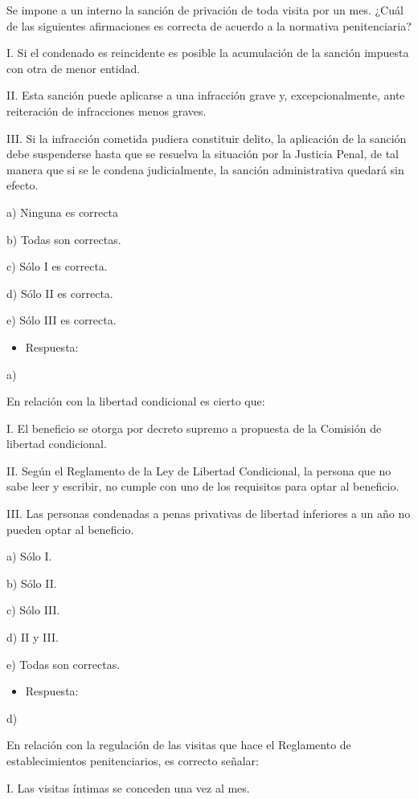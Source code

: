 \documentclass[letterpaper, 11pt]{article}
\begin{document}
Se impone a un interno la sanción de privación de toda visita por un mes. ¿Cuál de
las siguientes afirmaciones es correcta de acuerdo a la normativa penitenciaria?

I. Si el condenado es reincidente es posible la acumulación de la sanción impuesta
con otra de menor entidad.

II. Esta sanción puede aplicarse a una infracción grave y, excepcionalmente, ante
reiteración de infracciones menos graves.

III. Si la infracción cometida pudiera constituir delito, la aplicación de la sanción debe
suspenderse hasta que se resuelva la situación por la Justicia Penal, de tal manera
que si se le condena judicialmente, la sanción administrativa quedará sin efecto.

a) Ninguna es correcta

b) Todas son correctas.

c) Sólo I es correcta.

d) Sólo II es correcta.

e) Sólo III es correcta.

\begin{itemize}
\item Respuesta:
\end{itemize}
a)

En relación con la libertad condicional es cierto que:

I. El beneficio se otorga por decreto supremo a propuesta de la Comisión de libertad
condicional.

II. Según el Reglamento de la Ley de Libertad Condicional, la persona que no sabe leer
y escribir, no cumple con uno de los requisitos para optar al beneficio.

III. Las personas condenadas a penas privativas de libertad inferiores a un año no
pueden optar al beneficio.

a) Sólo I.

b) Sólo II.

c) Sólo III.

d) II y III.

e) Todas son correctas.

\begin{itemize}
\item Respuesta:
\end{itemize}
d)


En relación con la regulación de las visitas que hace el Reglamento de
establecimientos penitenciarios, es correcto señalar:

I. Las visitas íntimas se conceden una vez al mes.
\end{document}
